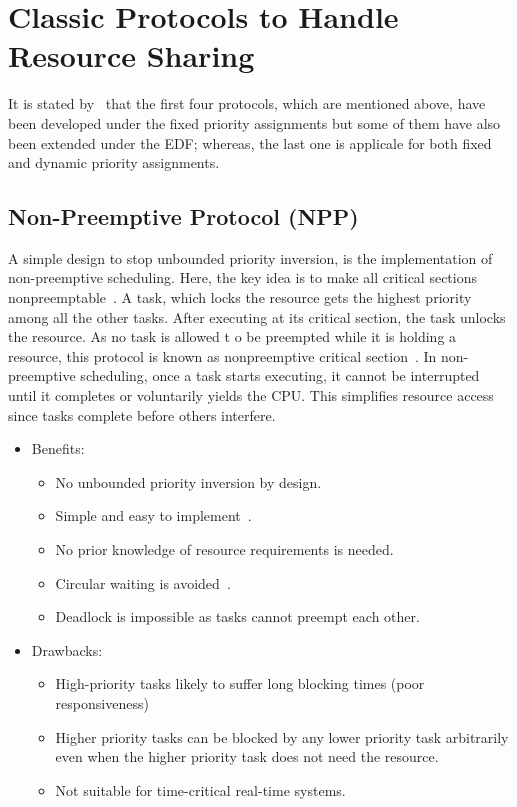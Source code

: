 \section{Classic Protocols to Handle Resource Sharing}
It is stated by~\cite{Buttazzo.2024} that the first four protocols, which are mentioned above, have been developed under the fixed priority assignments but some of them have also been extended under the EDF; whereas, the last one is applicale for both fixed and dynamic priority assignments.
\subsection{Non-Preemptive Protocol (NPP)}
A simple design to stop unbounded priority inversion, is the implementation of non-preemptive scheduling. Here, the key idea is to make all critical sections nonpreemptable~\cite{JiacunWang.2017}. A task, which locks the resource gets the highest priority among all the other tasks. After executing at its critical section, the task unlocks the resource. As no task is allowed t o be preempted while it is holding a resource, this protocol is known as nonpreemptive critical section~\cite{JiacunWang.2017}.  In non-preemptive scheduling, once a task starts executing, it cannot be interrupted until it completes or voluntarily yields the CPU. This simplifies resource access since tasks complete before others interfere.
\begin{itemize}
    \item Benefits: 
    \begin{itemize}
        \item No unbounded priority inversion by design.
        \item Simple and easy to implement~\cite{JiacunWang.2017}.
        \item No prior knowledge of resource requirements is needed.
        \item Circular waiting is avoided~\cite{JiacunWang.2017}.
        \item Deadlock is impossible as tasks cannot preempt each other.
    \end{itemize}
    \item Drawbacks:
    \begin{itemize}
        \item High-priority tasks likely to suffer long blocking times (poor responsiveness)
        \item Higher priority tasks can be blocked by any lower priority task arbitrarily even when the higher priority task does not need the resource.
        \item Not suitable for time-critical real-time systems.
    \end{itemize}
\end{itemize}
